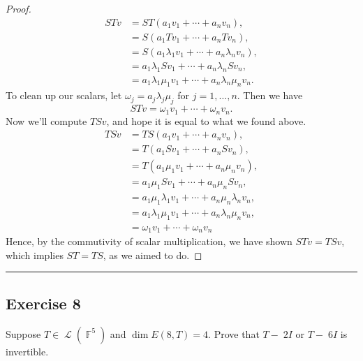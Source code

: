 \documentclass[letterpaper, 12pt]{amsart}
\DeclareMathOperator{\F}{\mathbb{F}}				%
\DeclareMathOperator{\Ell}{\mathscr{L}}				%
\theoremstyle{definition}  							%
\begin{document}
\begin{proof}
			\begin{align*}
				STv &= ST(a_{1}v_{1} + \cdots + a_{n}v_{n}), \\
				&= S ( a_{1}Tv_{1} + \cdots + a_{n}Tv_{n} ), \\
				&= S ( a_{1}\lambda_{1}v_{1} + \cdots + a_{n}\lambda_{n}v_{n} ), \\
				&= a_{1}\lambda_{1}Sv_{1} + \cdots + a_{n}\lambda_{n}Sv_{n}, \\
				&= a_{1}\lambda_{1}\mu_{1}v_{1} + \cdots + a_{n}\lambda_{n}\mu_{n}v_{n}.
			\end{align*}
		To clean up our scalars, let $\omega_{j} = a_{j}\lambda_{j}\mu_{j}$ for $j = 1,\dots,n$.
		Then we have $$STv = \omega_{1}v_{1} + \cdots + \omega_{n}v_{n}.$$
		Now we'll compute $TSv$, and hope it is equal to what we found above.
			\begin{align*}
				TSv &= TS(a_{1}v_{1} + \cdots + a_{n}v_{n}), \\
				&= T ( a_{1}Sv_{1} + \cdots + a_{n}Sv_{n} ), \\
				&= T ( a_{1}\mu_{1}v_{1} + \cdots + a_{n}\mu_{n}v_{n} ), \\
				&= a_{1}\mu_{1}Sv_{1} + \cdots + a_{n}\mu_{n}Sv_{n}, \\
				&= a_{1}\mu_{1}\lambda_{1}v_{1} + \cdots + a_{n}\mu_{n}\lambda_{n}v_{n}, \\
				&= a_{1}\lambda_{1}\mu_{1}v_{1} + \cdots + a_{n}\lambda_{n}\mu_{n}v_{n}, \\
				&= \omega_{1}v_{1} + \cdots + \omega_{n}v_{n}
			\end{align*}
		Hence, by the commutivity of scalar multiplication, we have shown $STv = TSv$, which implies $ST = TS$, as we aimed to do.
		\end{proof}
		\vspace*{2mm}
		\hrule
		\vspace*{2mm}

		\subsection*{Exercise 8}
		Suppose $T \in \Ell(\F^{5})$ and $\dim{E(8, T)} = 4$.
		Prove that $T-􏰋2I$ or $T-􏰋6I$ is invertible.
		\vspace*{3mm}
\end{document}
